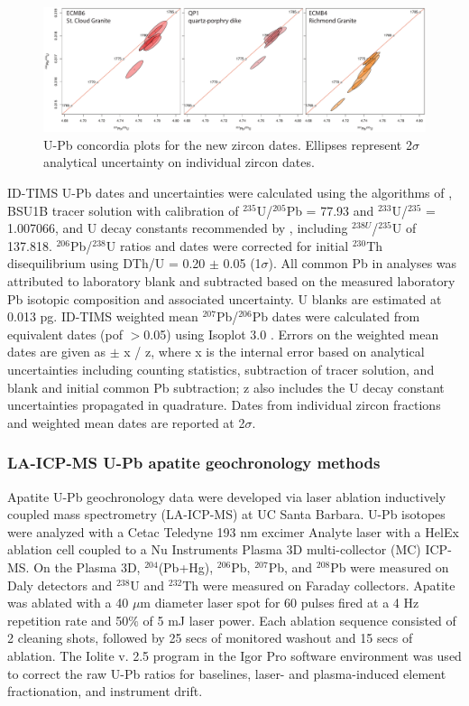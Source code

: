 \documentclass[11pt,letterpaper]{article}
\begin{document}
\begin{figure}[!ht]
\noindent\includegraphics[width=\textwidth]{./figures/SI_zircon_concordia.pdf}
\centering
\caption{\small{U-Pb concordia plots for the new zircon dates. Ellipses represent  2$\sigma$ analytical uncertainty on individual zircon dates.}}
\label{fig:zircon_concordia}
\end{figure}

ID-TIMS U-Pb dates and uncertainties were calculated using the algorithms of \cite{Schmitz2007b}, BSU1B tracer solution with calibration of $^{235}$U/$^{205}$Pb = 77.93 and $^{233}$U/$^{235}$ = 1.007066, and U decay constants recommended by \cite{Hiess2012a}, including $^{238U}$/$^{235}$U of 137.818. $^{206}$Pb/$^{238}$U ratios and dates were corrected for initial $^{230}$Th disequilibrium using DTh/U = 0.20 $\pm$ 0.05 (1$\sigma$). All common Pb in analyses was attributed to laboratory blank and subtracted based on the measured laboratory Pb isotopic composition and associated uncertainty. U blanks are estimated at 0.013 pg. ID-TIMS weighted mean $^{207}$Pb/$^{206}$Pb dates were calculated from equivalent dates (pof $>$0.05) using Isoplot 3.0 \citep{Ludwig2003a}. Errors on the weighted mean dates are given as $\pm$ x / z, where x is the internal error based on analytical uncertainties including counting statistics, subtraction of tracer solution, and blank and initial common Pb subtraction; z also includes the U decay constant uncertainties propagated in quadrature. Dates from individual zircon fractions and weighted mean dates are reported at 2$\sigma$.

\subsubsection*{LA-ICP-MS U-Pb apatite geochronology methods}

Apatite U-Pb geochronology data were developed via laser ablation inductively coupled mass spectrometry (LA-ICP-MS) at UC Santa Barbara. U-Pb isotopes were analyzed with a Cetac Teledyne 193 nm excimer Analyte laser with a HelEx ablation cell coupled to a Nu Instruments Plasma 3D multi-collector (MC) ICP-MS. On the Plasma 3D, $^{204}$(Pb+Hg), $^{206}$Pb, $^{207}$Pb, and $^{208}$Pb were measured on Daly detectors and $^{238}$U and $^{232}$Th were measured on Faraday collectors. Apatite was ablated with a 40 $\mu$m diameter laser spot for 60 pulses fired at a 4 Hz repetition rate and 50$\%$ of 5 mJ laser power. Each ablation sequence consisted of 2 cleaning shots, followed by 25 secs of monitored washout and 15 secs of ablation. The Iolite v. 2.5 program \citep{Paton2011a} in the Igor Pro software environment was used to correct the raw U-Pb ratios for baselines, laser- and plasma-induced element fractionation, and instrument drift.
\end{document}
